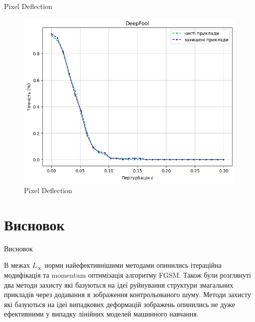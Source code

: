 \documentclass[aspectratio=169]{beamer}
\begin{document}
\begin{frame}{Pixel Deflection}
\begin{figure}[!htb]
			\endminipage
			\includegraphics[width=1\textwidth]{../CourseWorkLatex/resources/deepfool_defl_defence.png}
			\endminipage\hfill
			\caption{Pixel Deflection}
			\label{fig:pixeldeflection}
		\end{figure}
	\end{frame}

	\section{Висновок}
	\begin{frame}{Висновок}
		
	В межах $L_{\infty}$ норми найефективнішими методами опинились ітераційна модифікація та momentum оптимізація алгоритму FGSM. Також були розглянуті два методи захисту які базуються на ідеї руйнування структури змагальних прикладів через додавання в зображення контрольованого шуму. Методи захисту які базуються на ідеї випадкових деформацій зображень опинились не дуже ефективними у випадку лінійних моделей машинного навчання. 
	
	\end{frame}
\end{document}

